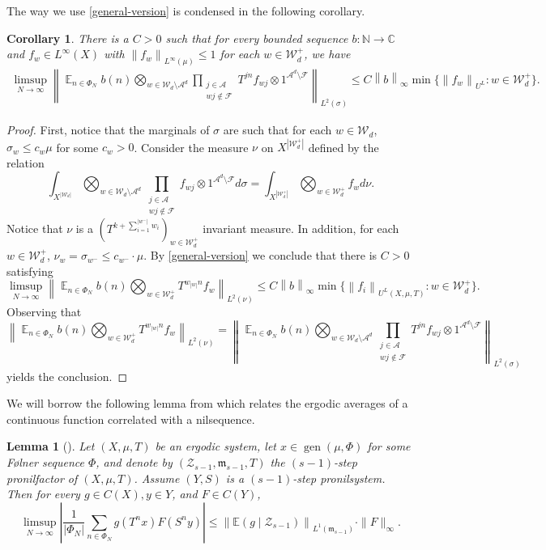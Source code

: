 \documentclass[letter,11pt]{article}
\newtheorem{cor}[theo]{Corollary}
\newtheorem{lemma}[theo]{Lemma}
\theoremstyle{definition}
\newcommand{\N}{\mathbb{N}}
\newcommand{\C}{\mathbb{C}}
\newcommand{\sF}{\mathcal{F}}
\newcommand{\sA}{\mathcal{A}}
\newcommand{\bE}{\mathop{\mathbb{E}}}
\newcommand{\norm}[1]{\left\lVert#1\right\rVert}
\begin{document}
The way we use \cref{general-version} is condensed in the following corollary.
\begin{cor}\label{first-approx}
    There is a $C>0$ such that for every bounded sequence $b:\N\to \C$ and $f_w\in L^\infty(X)$ with $\norm{f_w}_{L^\infty(\mu)}\leq 1$ for each $w\in \mathcal{W}_{d}^{+}$, we have  
    \begin{align*}
            \limsup_{N\to\infty} \norm{\bE_{n\in \Phi_N} b(n) \bigotimes_{w\in \mathcal{W}_{d}\setminus\sA^d }  \prod_{\substack{j\in\sA\\ wj\notin \sF}} T^{jn}   f_{wj} \otimes 1^{\sA^d\setminus \sF}
   }_{L^2(\sigma)}\leq C \norm{b}_\infty \min\{ \norm{f_w}_{U^L} :  w\in \mathcal{W}_{d}^{+}\}.
    \end{align*}
\end{cor}
\begin{proof}
    First, notice that the marginals of $\sigma$ are such that for each $w\in \mathcal{W}_d$, $\sigma_w\leq c_w \mu$ for some $c_w>0$. Consider the measure $\nu$ on $X^{|\mathcal{W}_{d}^{+}|}$ defined by the relation 
    $$\int_{X^{|\mathcal{W}_d|}} \bigotimes_{w\in \mathcal{W}_{d}\setminus\sA^d }  \prod_{\substack{j\in\sA\\ wj\notin \sF}}  f_{wj} \otimes 1^{\sA^d\setminus \sF} d\sigma = \int_{X^{| \mathcal{W}_{d}^{+}|} } \bigotimes_{w\in \mathcal{W}_d^{+}} f_w d\nu. $$
    Notice that $\nu$ is a $(T^{k+ \sum_{i=1}^{|w^-|}w_i} )_{w\in \mathcal{W}_d^{+}}$ invariant measure. In addition, for each $w\in \mathcal{W}_{d}^{+}$, $\nu_{w}= \sigma_{w^- }\leq c_{w^- }\cdot \mu. $ By \cref{general-version} we conclude that there is $C>0$ satisfying
    $$          \limsup_{N\to\infty} \norm{\bE_{n\in \Phi_N} b(n) \bigotimes_{w\in \mathcal{W}_d^{+}}  T^{w_{|w|}n}f_w  
   }_{L^2(\nu)}\leq C \norm{b}_\infty \min\{ \norm{f_i}_{U^{L}(X,\mu,T)} : w\in \mathcal{W}_d^{+}\} . $$
   Observing that 
   $$\norm{\bE_{n\in \Phi_N} b(n) \bigotimes_{w\in \mathcal{W}_d^{+}} T^{w_{|w|}n}f_w  
   }_{L^2(\nu)}=  \norm{\bE_{n\in \Phi_N} b(n) \bigotimes_{w\in \mathcal{W}_{d}\setminus\sA^d }  \prod_{\substack{j\in\sA\\ wj\notin \sF}} T^{jn}   f_{wj} \otimes 1^{\sA^d\setminus \sF}
   }_{L^2(\sigma)} $$
   yields the conclusion.
\end{proof}

We will borrow the following lemma from \cite{kmrr25} which relates the ergodic averages of a continuous function correlated with a nilsequence.

 \begin{lemma}[{\cite[Lemma 6.11]{kmrr25}}]\label{second-approx}
 Let $(X, \mu, T)$ be an ergodic system, let $x \in \operatorname{gen}(\mu, \Phi)$ for some Følner sequence $\Phi$, and denote by $\left(\mathcal{Z}_{s-1}, \mathfrak{m}_{s-1}, T\right)$ the $(s-1)$-step pronilfactor of $(X, \mu, T)$. Assume $(Y, S)$ is a $(s-1)$-step pronilsystem. Then for every $g \in C(X), y \in Y$, and $F \in C(Y)$,
$$
\limsup _{N \rightarrow \infty}\left|\frac{1}{\left|\Phi_N\right|} \sum_{n \in \Phi_N} g\left(T^n x\right) F\left(S^n y\right)\right| \leqslant\left\|\mathbb{E}\left(g \mid \mathcal{Z}_{s-1}\right)\right\|_{L^1\left(\mathfrak{m}_{s-1}\right)} \cdot\|F\|_{\infty}.
$$
 \end{lemma}
\end{document}

